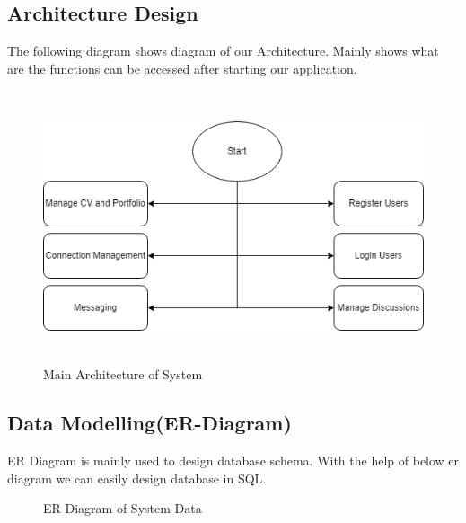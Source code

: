 \subsection{Architecture Design}
The following diagram shows diagram of our Architecture. Mainly shows what are the functions can be accessed after starting our application.
\begin{figure}[H]
    \includegraphics[height = 8cm]{Diagrams/Main_Block.png}
    \caption{Main Architecture of System}
\end{figure}
\newpage
\subsection{Data Modelling(ER-Diagram)}
ER Diagram is mainly used to design database schema. With the help of below er diagram we can easily design database in SQL.
\begin{figure}[H]
    \caption{ER Diagram of System Data}
\end{figure}
\newpage
